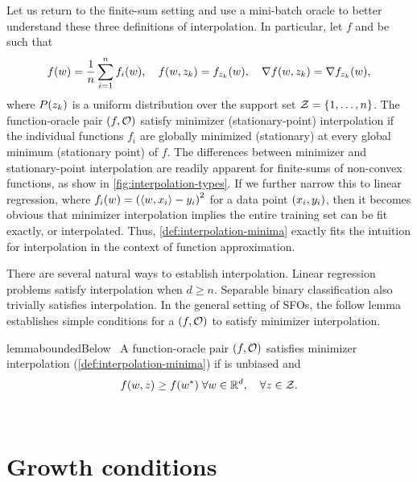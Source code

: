 Let us return to the finite-sum setting and use a mini-batch oracle to better understand these three definitions of interpolation.
In particular, let \( f \) and \oracle{} be such that
\[ f(\w) =  \frac{1}{n} \sum_{i=1}^{n} f_i(\w), \quad f(\w, \zk) = f_{\zk}(\w), \quad \grad(\w, \zk) = \grad_{\zk}(\w),  \]
where \( P(\zk) \) is a uniform distribution over the support set \( \calZ = \cbr{1, \ldots, n} \).
The function-oracle pair \( \rbr{f, \oracle{}} \) satisfy minimizer (stationary-point) interpolation if the individual functions \( f_i \) are globally minimized (stationary) at every global minimum (stationary point) of \( f \).
The differences between minimizer and stationary-point interpolation are readily apparent for finite-sums of non-convex functions, as show in \autoref{fig:interpolation-types}.
If we further narrow this to linear regression, where \( f_i(\w) = \rbr{\abr{\w, x_i} - y_i}^2 \) for a data point \( \rbr{x_i, y_i} \), then it becomes obvious that minimizer interpolation implies the entire training set can be fit exactly, or interpolated.
Thus, \autoref{def:interpolation-minima} exactly fits the intuition for interpolation in the context of function approximation.

There are several natural ways to establish interpolation.
Linear regression problems satisfy interpolation when \( d \geq n \).
Separable binary classification also trivially satisfies interpolation.
In the general setting of SFOs, the follow lemma establishes simple conditions for a \( \rbr{f, \oracle{}} \) to satisfy minimizer interpolation.
\begin{restatable}{lemma}{boundedBelow}~\label{thm:bounded-below}
    A function-oracle pair \( \rbr{f, \oracle{}} \) satisfies minimizer interpolation (\autoref{def:interpolation-minima}) if \oracle{} is unbiased and 
    \[ f(\w, \z ) \geq f(\wopt) \; \forall \w \in \R^d,  \quad \forall \z \in \calZ. \]
\end{restatable}
\\

\section{Growth conditions}\label{sec:growth_conditions}

